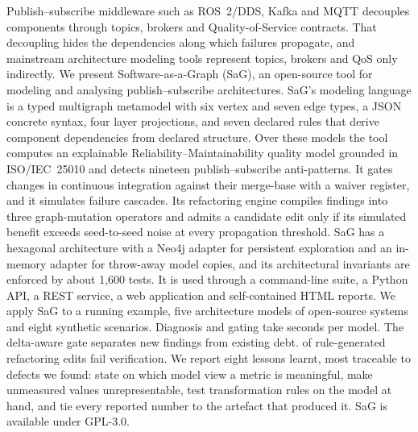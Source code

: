 Publish--subscribe middleware such as ROS~2/DDS, Kafka and MQTT decouples components through topics, brokers and Quality-of-Service contracts. That decoupling hides the dependencies along which failures propagate, and mainstream architecture modeling tools represent topics, brokers and QoS only indirectly. We present Software-as-a-Graph (SaG), an open-source tool for modeling and analysing publish--subscribe architectures. SaG's modeling language is a typed multigraph metamodel with six vertex and seven edge types, a JSON concrete syntax, four layer projections, and seven declared rules that derive component dependencies from declared structure. Over these models the tool computes an explainable Reliability--Maintainability quality model grounded in ISO/IEC~25010 and detects nineteen publish--subscribe anti-patterns. It gates changes in continuous integration against their merge-base with a waiver register, and it simulates failure cascades. Its refactoring engine compiles findings into three graph-mutation operators and admits a candidate edit only if its simulated benefit exceeds seed-to-seed noise at every propagation threshold. SaG has a hexagonal architecture with a Neo4j adapter for persistent exploration and an in-memory adapter for throw-away model copies, and its architectural invariants are enforced by about 1,600 tests. It is used through a command-line suite, a Python API, a REST service, a web application and self-contained HTML reports. We apply SaG to a running example, five architecture models of open-source systems and eight synthetic scenarios. Diagnosis and gating take \AbsGateRange{} seconds per model. The delta-aware gate separates new findings from existing debt. \PrescribeRejectedPct{} of rule-generated refactoring edits fail verification. We report eight lessons learnt, most traceable to defects we found: state on which model view a metric is meaningful, make unmeasured values unrepresentable, test transformation rules on the model at hand, and tie every reported number to the artefact that produced it. SaG is available under GPL-3.0.
